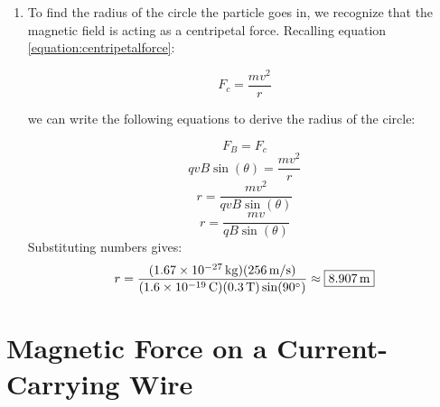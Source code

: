 \begin{mdframed}[backgroundcolor=blue!10!white]
\begin{enumerate}[label=(\alph*)]
	  Solving for the magnitude of the force, we find:
	  
	  	\begin{equation*}
	  	|\overrightarrow{F_B}| = |{q \vec{v} \times \vec{B}}| = qvB \sin(\theta) = (\SI{1.6E-19}{C})(\SI{256}{m/s})(\SI{0.3}{T}) \sin(90 \degree) 
	  \end{equation*}
  	\begin{equation*}
  	|\overrightarrow{F_B}| \approx \boxed{\SI{1.229E-17}{N}}
  	\end{equation*}
	
		\item To find the radius of the circle the particle goes in, we recognize that the magnetic field is acting as a centripetal force.  Recalling equation \ref{equation:centripetalforce}:
		
		\begin{equation*}
			F_c = \frac{mv^2}{r}
		\end{equation*}
		
		
		we can write the following equations to derive the radius of the circle:
			
		\begin{equation*}
			F_B = F_c
		\end{equation*}
		\begin{equation*}
			 qvB \sin(\theta) = \frac{mv^2}{r} 
		\end{equation*}
		\begin{equation*}
			r = \frac{mv^2}{qvB \sin(\theta)}
		\end{equation*}
	\begin{equation*}
		r = \frac{mv}{qB \sin(\theta)}
	\end{equation*}
	Substituting numbers gives:
		\begin{equation*}
		r = \frac{(\SI{1.67E-27}{kg}) (\SI{256}{m/s})} {(\SI{1.6E-19}{C}) (\SI{0.3}{T}) \sin(90 \degree)} \approx \boxed{\SI{8.907}{m}}
	\end{equation*}
	
	
	\end{enumerate}
		
	\end{mdframed}
	
	
	

	
	
	\section{Magnetic Force on a Current-Carrying Wire}

